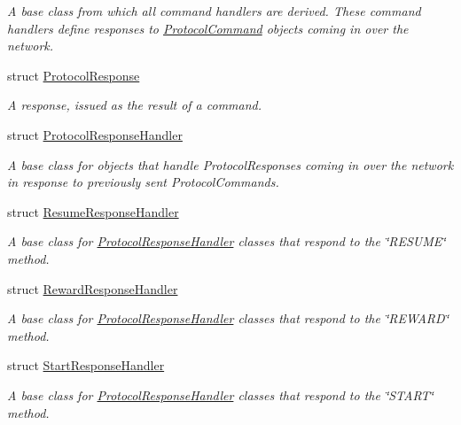 \begin{DoxyCompactItemize}
\begin{DoxyCompactList}\small\item\em A base class from which all command handlers are derived. These command handlers define responses to \hyperlink{struct_picto_1_1_protocol_command}{Protocol\-Command} objects coming in over the network. \end{DoxyCompactList}\item 
struct \hyperlink{struct_picto_1_1_protocol_response}{Protocol\-Response}
\begin{DoxyCompactList}\small\item\em A response, issued as the result of a command. \end{DoxyCompactList}\item 
struct \hyperlink{struct_picto_1_1_protocol_response_handler}{Protocol\-Response\-Handler}
\begin{DoxyCompactList}\small\item\em A base class for objects that handle Protocol\-Responses coming in over the network in response to previously sent Protocol\-Commands. \end{DoxyCompactList}\item 
struct \hyperlink{struct_picto_1_1_resume_response_handler}{Resume\-Response\-Handler}
\begin{DoxyCompactList}\small\item\em A base class for \hyperlink{struct_picto_1_1_protocol_response_handler}{Protocol\-Response\-Handler} classes that respond to the \char`\"{}\-R\-E\-S\-U\-M\-E\char`\"{} method. \end{DoxyCompactList}\item 
struct \hyperlink{struct_picto_1_1_reward_response_handler}{Reward\-Response\-Handler}
\begin{DoxyCompactList}\small\item\em A base class for \hyperlink{struct_picto_1_1_protocol_response_handler}{Protocol\-Response\-Handler} classes that respond to the \char`\"{}\-R\-E\-W\-A\-R\-D\char`\"{} method. \end{DoxyCompactList}\item 
struct \hyperlink{struct_picto_1_1_start_response_handler}{Start\-Response\-Handler}
\begin{DoxyCompactList}\small\item\em A base class for \hyperlink{struct_picto_1_1_protocol_response_handler}{Protocol\-Response\-Handler} classes that respond to the \char`\"{}\-S\-T\-A\-R\-T\char`\"{} method. \end{DoxyCompactList}\item 

\end{DoxyCompactItemize}
